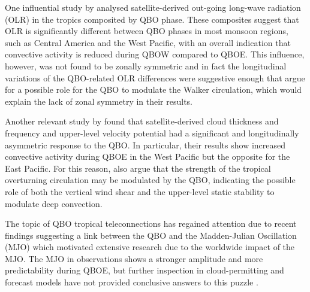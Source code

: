 One influential study by \cite{collimore2003} analysed satellite-derived out-going long-wave radiation (OLR) in the tropics composited by QBO phase. These composites suggest that OLR is significantly different between QBO phases in most monsoon regions, such as Central America  and the West Pacific, with an overall indication that convective activity is reduced during QBOW compared to QBOE. This influence, however, was not found to be zonally symmetric and in fact the longitudinal variations of the QBO-related OLR differences were suggestive enough that \cite{collimore2003} argue for a possible role for the QBO to modulate the Walker circulation, which would explain the lack of zonal symmetry in their results. 


Another relevant study by \cite{liess2012} found that satellite-derived cloud thickness and frequency  and upper-level velocity potential had a significant and longitudinally asymmetric response to the QBO. In particular, their results show increased convective activity during QBOE in the West Pacific but the opposite for the East Pacific.  For this reason, \cite{liess2012} also argue that the strength of the tropical overturning circulation may be modulated by the QBO, indicating the possible role of both the vertical wind shear and the upper-level static stability to modulate deep convection. 

The topic of QBO tropical teleconnections has regained attention due to recent findings suggesting a link between the QBO and the Madden-Julian Oscillation (MJO) \citep{son2017} which motivated extensive research \citep[see e.g.][]{lee2018,wang2019,martin2020jgr} due to the worldwide impact of the MJO.
 The MJO in observations shows a stronger amplitude and more predictability during QBOE, but further inspection in cloud-permitting and forecast models have not provided conclusive answers to this puzzle \citep{martin2019,martin2020jgr}. 
 
 
